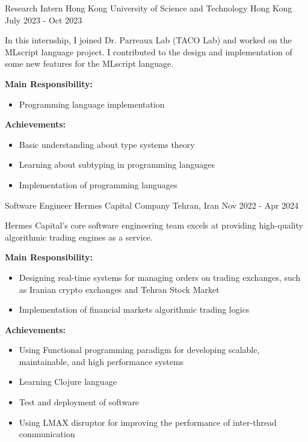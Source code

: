 \begin{cventries}
  \cventry
  {Research Intern} %
  {Hong Kong University of Science and Technology} %
  {Hong Kong} %
  {July 2023 - Oct 2023} %
  {
    \begin{cvitems} %
    \item {In this internship, I joined Dr. Parreaux Lab (TACO Lab) and worked
        on the MLscript language project.  I contributed to the design and
        implementation of some new features for the MLscript language.}
    \item {\textbf{Main Responsibility:}
        \begin{itemize}[label=-]
        \item Programming language implementation
        \end{itemize}
      }
    \item {\textbf{Achievements:}
        \begin{itemize}[label=-]
        \item Basic understanding about type systems theory
        \item Learning about subtyping in programming languages
        \item Implementation of programming languages
        \end{itemize}
      }
    \end{cvitems}
  }

  \cventry
  {Software Engineer}
  {Hermes Capital Company}
  {Tehran, Iran}
  {Nov 2022 - Apr 2024}
  {
    \begin{cvitems}
      \item {Hermes Capital's core software engineering team excels at providing high-quality algorithmic trading engines as a service.}
      \item {\textbf{Main Responsibility:}
            \begin{itemize}[label=-]
                \item Designing real-time systems for managing orders on trading exchanges, such as Iranian crypto exchanges and Tehran Stock Market
                \item Implementation of financial markets algorithmic trading logics
            \end{itemize}
            }
      \item {\textbf{Achievements:}
            \begin{itemize}[label=-]
                \item Using Functional programming paradigm for developing scalable, maintainable, and high performance systems
                \item Learning Clojure language
                \item Test and deployment of software
                \item Using LMAX disruptor for improving the performance of inter-thread communication
            \end{itemize}
            }
    \end{cvitems}
  }


\end{cventries}
